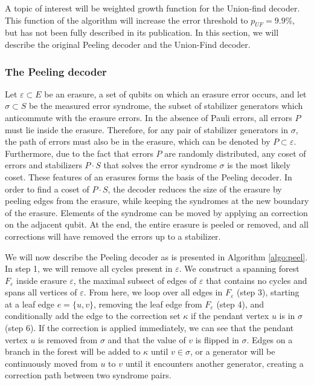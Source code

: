 A topic of interest will be weighted growth function for the Union-find decoder. This function of the algorithm will increase the error threshold to $p_{UF} = 9.9\%$, but has not been fully described in its publication.  In this section, we will describe the original Peeling decoder and the Union-Find decoder.   \\

\subsubsection{The Peeling decoder}
Let $\varepsilon \subset E$ be an erasure, a set of qubits on which an erasure error occurs, and let $\sigma \subset S$ be the measured error syndrome, the subset of stabilizer generators which anticommute with the erasure errors. In the absence of Pauli errors, all errors $P$ must lie inside the erasure. Therefore, for any pair of stabilizer generators in $\sigma$, the path of errors must also be in the erasure, which can be denoted by $P\subset \varepsilon$. Furthermore, due to the fact that errors $P$ are randomly distributed, any coset of errors and stabilizers $P\cdot S$ that solves the error syndrome $\sigma$ is the most likely coset. These features of an erasures forms the basis of the Peeling decoder. In order to find a coset of $P \cdot S$, the decoder reduces the size of the erasure by peeling edges from the erasure, while keeping the syndromes at the new boundary of the erasure. Elements of the syndrome can be moved by applying an correction on the adjacent qubit. At the end, the entire erasure is peeled or removed, and all corrections will have removed the errors up to a stabilizer.




We will now describe the Peeling decoder as is presented in Algorithm \ref{algo:peel}. In step 1, we will remove all cycles present in $\varepsilon$. We construct a spanning forest $F_\varepsilon$ inside erasure $\varepsilon$, the maximal subsect of edges of $\varepsilon$ that contains no cycles and spans all vertices of $\varepsilon$. From here, we loop over all edges in $F_\varepsilon$ (step 3), starting at a leaf edge $e = \{u,v\}$, removing the leaf edge from $F_\varepsilon$ (step 4), and conditionally add the edge to the correction set $\kappa$ if the pendant vertex $u$ is in $\sigma$ (step 6). If the correction is applied immediately, we can see that the pendant vertex $u$ is removed from $\sigma$ and that the value of $v$ is flipped in $\sigma$. Edges on a branch in the forest will be added to $\kappa$ until $v \in \sigma$, or a generator will be continuously moved from $u$ to $v$ until it encounters another generator, creating a correction path between two syndrome pairs.

